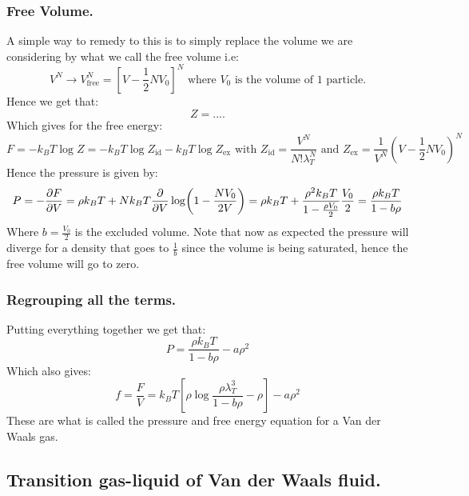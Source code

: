 \documentclass[10pt,a4paper]{book}
\begin{document}
\subsubsection{Free Volume.}
A simple way to remedy to this is to simply replace the volume we are considering by what we call the free volume i.e:
\[
V^N \rightarrow V_\text{free}^N = [V - \frac{1}{2} N V_0]^N \text{ where } V_0 \text{ is the volume of 1 particle.}
\]
Hence we get that:
\[
Z = ....
\]
Which gives for the free energy:
\[
F = -k_B T \log Z = - k_B T \log Z_\text{id} - k_B T \log Z_\text{ex} \text{ with } Z_\text{id} = \frac{V^N}{N! \lambda^N_T} \text{ and } Z_\text{ex} = \frac{1}{V^N} (V - \frac{1}{2}N V_0)^N
\]
Hence the pressure is given by:
\[
P = -\pdv{F}{V} = \rho k_B T + N k_B T \pdv{}{V} \log(1 - \frac{N V_0}{2 V}) = \rho k_B T + \frac{\rho^2 k_B T}{1 - \frac{\rho V_0}{2}} \frac{V_0}{2} = \frac{\rho k_B T}{1 - b \rho}
\]
Where $b = \frac{V_0}{2}$ is the excluded volume. Note that now as expected the pressure will diverge for a density that goes to $\frac{1}{b}$ since the volume is being saturated, hence the free volume will go to zero.

\subsubsection{Regrouping all the terms.}
Putting everything together we get that:
\[
P = \frac{\rho k_B T}{1 - b \rho} - a \rho^2
\]
Which also gives:
\[
f = \frac{F}{V} = k_B T [\rho \log \frac{\rho \lambda^3_T}{1 - b \rho} - \rho] - a \rho^2
\]
These are what is called the pressure and free energy equation for a Van der Waals gas. 

\subsection{Transition gas-liquid of Van der Waals fluid.}
\end{document}
